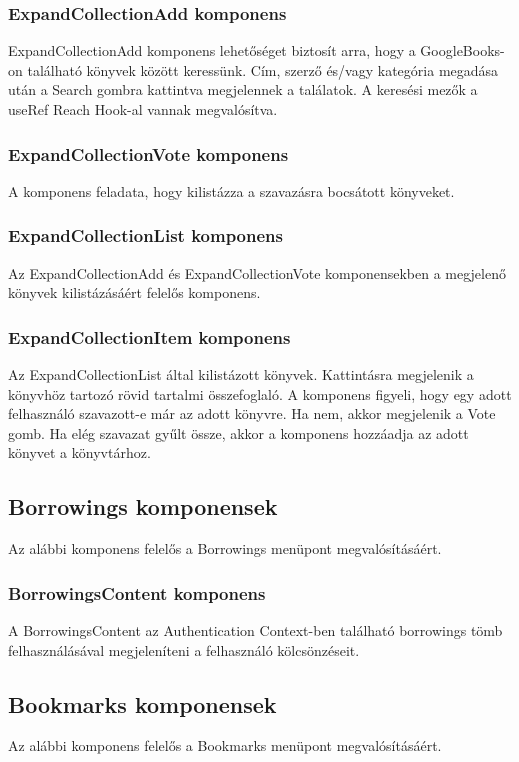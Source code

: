 \subsubsection{ExpandCollectionAdd komponens}
ExpandCollectionAdd komponens lehetőséget biztosít arra, hogy a GoogleBooks-on található könyvek között keressünk. Cím, szerző és/vagy kategória megadása után a Search gombra kattintva megjelennek a találatok. A keresési mezők a useRef Reach Hook-al vannak megvalósítva. 

\subsubsection{ExpandCollectionVote komponens}
A komponens feladata, hogy kilistázza a szavazásra bocsátott könyveket.

\subsubsection{ExpandCollectionList komponens}
Az ExpandCollectionAdd és ExpandCollectionVote komponensekben a megjelenő könyvek kilistázásáért felelős komponens.

\subsubsection{ExpandCollectionItem komponens}
Az ExpandCollectionList által kilistázott könyvek. Kattintásra megjelenik a könyvhöz tartozó rövid tartalmi összefoglaló. A komponens figyeli, hogy egy adott felhasználó szavazott-e már az adott könyvre. Ha nem, akkor megjelenik a Vote gomb. Ha elég szavazat gyűlt össze, akkor a komponens hozzáadja az adott könyvet a könyvtárhoz. 

\subsection{Borrowings komponensek}
Az alábbi komponens felelős a Borrowings menüpont megvalósításáért.

\subsubsection{BorrowingsContent komponens}
A BorrowingsContent az Authentication Context-ben található borrowings tömb felhasználásával megjeleníteni a felhasználó kölcsönzéseit.

\subsection{Bookmarks komponensek}
Az alábbi komponens felelős a Bookmarks menüpont megvalósításáért.

